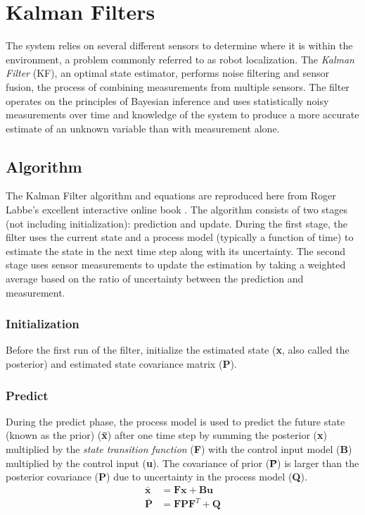 \documentclass[12pt,letterpaper,titlepage]{report}
\begin{document}
\section{Kalman Filters}
The system relies on several different sensors to determine where it is within the environment, a problem commonly referred to as robot localization. The \textit{Kalman Filter} (KF), an optimal state estimator, performs noise filtering and sensor fusion, the process of combining measurements from multiple sensors. The filter operates on the principles of Bayesian inference and uses statistically noisy measurements over time and knowledge of the system to produce a more accurate estimate of an unknown variable than with measurement alone.

\subsection{Algorithm}
The Kalman Filter algorithm and equations are reproduced here from Roger Labbe's excellent interactive online book \autocite{labbe_2017}.  The algorithm consists of two stages (not including initialization): prediction and update. During the first stage, the filter uses the current state and a process model (typically a function of time) to estimate the state in the next time step along with its uncertainty. The second stage uses sensor measurements to update the estimation by taking a weighted average based on the ratio of uncertainty between the prediction and measurement. 

\subsubsection*{Initialization}
Before the first run of the filter, initialize the estimated state (\textbf{x}, also called the posterior) and estimated state covariance matrix (\textbf{P}).
\subsubsection*{Predict}
During the predict phase, the process model is used to predict the future state (known as the prior) (\textbf{\=x}) after one time step by summing the posterior (\textbf{x}) multiplied by the \textit{state transition function} (\textbf{F}) with the control input model (\textbf{B}) multiplied by the control input (\textbf{u}). The covariance of prior (\textbf{\=P}) is larger than the posterior covariance (\textbf{P}) due to uncertainty in the process model (\textbf{Q}).
\begin{align*}
\bar{\textbf{x}} &= \textbf{Fx} + \textbf{Bu}\\
\bar{\textbf{P}} &= \textbf{FPF}^T + \textbf{Q}\\
\end{align*}
\end{document}
